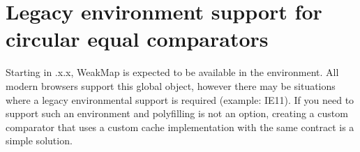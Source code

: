 \chapter{Legacy environment support for circular equal comparators }
\hypertarget{md__c_1_2_users_2saket_2_one_drive_2_desktop_2e_pathshala_2epathshala-_web_2node__modules_2fast-8790ce49603fcebb7cf5c9b91cecc2d8}{}\label{md__c_1_2_users_2saket_2_one_drive_2_desktop_2e_pathshala_2epathshala-_web_2node__modules_2fast-8790ce49603fcebb7cf5c9b91cecc2d8}
\label{md__c_1_2_users_2saket_2_one_drive_2_desktop_2e_pathshala_2epathshala-_web_2node__modules_2fast-8790ce49603fcebb7cf5c9b91cecc2d8_autotoc_md11109}%
%


Starting in {.\+x.\+x}, {\ttfamily Weak\+Map} is expected to be available in the environment. All modern browsers support this global object, however there may be situations where a legacy environmental support is required (example\+: IE11). If you need to support such an environment and polyfilling is not an option, creating a custom comparator that uses a custom cache implementation with the same contract is a simple solution.



